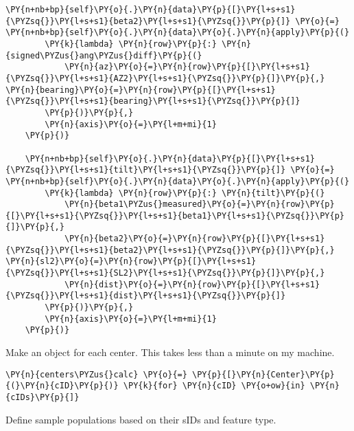 \begin{tcolorbox}[breakable, size=fbox, boxrule=1pt, pad at break*=1mm,colback=cellbackground, colframe=cellborder]
\begin{Verbatim}[commandchars=\\\{\}]
    \PY{n+nb+bp}{self}\PY{o}{.}\PY{n}{data}\PY{p}{[}\PY{l+s+s1}{\PYZsq{}}\PY{l+s+s1}{beta2}\PY{l+s+s1}{\PYZsq{}}\PY{p}{]} \PY{o}{=} \PY{n+nb+bp}{self}\PY{o}{.}\PY{n}{data}\PY{o}{.}\PY{n}{apply}\PY{p}{(}
        \PY{k}{lambda} \PY{n}{row}\PY{p}{:} \PY{n}{signed\PYZus{}ang\PYZus{}diff}\PY{p}{(}
            \PY{n}{az}\PY{o}{=}\PY{n}{row}\PY{p}{[}\PY{l+s+s1}{\PYZsq{}}\PY{l+s+s1}{AZ2}\PY{l+s+s1}{\PYZsq{}}\PY{p}{]}\PY{p}{,} \PY{n}{bearing}\PY{o}{=}\PY{n}{row}\PY{p}{[}\PY{l+s+s1}{\PYZsq{}}\PY{l+s+s1}{bearing}\PY{l+s+s1}{\PYZsq{}}\PY{p}{]}
        \PY{p}{)}\PY{p}{,}
        \PY{n}{axis}\PY{o}{=}\PY{l+m+mi}{1}
    \PY{p}{)}
    
    \PY{n+nb+bp}{self}\PY{o}{.}\PY{n}{data}\PY{p}{[}\PY{l+s+s1}{\PYZsq{}}\PY{l+s+s1}{tilt}\PY{l+s+s1}{\PYZsq{}}\PY{p}{]} \PY{o}{=} \PY{n+nb+bp}{self}\PY{o}{.}\PY{n}{data}\PY{o}{.}\PY{n}{apply}\PY{p}{(}
        \PY{k}{lambda} \PY{n}{row}\PY{p}{:} \PY{n}{tilt}\PY{p}{(}
            \PY{n}{beta1\PYZus{}measured}\PY{o}{=}\PY{n}{row}\PY{p}{[}\PY{l+s+s1}{\PYZsq{}}\PY{l+s+s1}{beta1}\PY{l+s+s1}{\PYZsq{}}\PY{p}{]}\PY{p}{,}
            \PY{n}{beta2}\PY{o}{=}\PY{n}{row}\PY{p}{[}\PY{l+s+s1}{\PYZsq{}}\PY{l+s+s1}{beta2}\PY{l+s+s1}{\PYZsq{}}\PY{p}{]}\PY{p}{,} \PY{n}{sl2}\PY{o}{=}\PY{n}{row}\PY{p}{[}\PY{l+s+s1}{\PYZsq{}}\PY{l+s+s1}{SL2}\PY{l+s+s1}{\PYZsq{}}\PY{p}{]}\PY{p}{,}
            \PY{n}{dist}\PY{o}{=}\PY{n}{row}\PY{p}{[}\PY{l+s+s1}{\PYZsq{}}\PY{l+s+s1}{dist}\PY{l+s+s1}{\PYZsq{}}\PY{p}{]}
        \PY{p}{)}\PY{p}{,}
        \PY{n}{axis}\PY{o}{=}\PY{l+m+mi}{1}
    \PY{p}{)}
\end{Verbatim}
\end{tcolorbox}

Make an object for each center. This takes less than a minute on my
machine.

\begin{tcolorbox}[breakable, size=fbox, boxrule=1pt, pad at break*=1mm,colback=cellbackground, colframe=cellborder]
\begin{Verbatim}[commandchars=\\\{\}]
\PY{n}{centers\PYZus{}calc} \PY{o}{=} \PY{p}{[}\PY{n}{Center}\PY{p}{(}\PY{n}{cID}\PY{p}{)} \PY{k}{for} \PY{n}{cID} \PY{o+ow}{in} \PY{n}{cIDs}\PY{p}{]}
\end{Verbatim}
\end{tcolorbox}

Define sample populations based on their sIDs and feature type.

